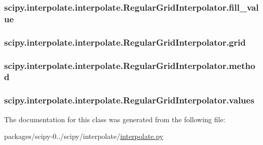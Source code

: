 \subsubsection[{fill\+\_\+value}]{\setlength{\rightskip}{0pt plus 5cm}scipy.\+interpolate.\+interpolate.\+Regular\+Grid\+Interpolator.\+fill\+\_\+value}\label{classscipy_1_1interpolate_1_1interpolate_1_1RegularGridInterpolator_a38ab6f966f9896146ecb5e2b28010e75}
\hypertarget{classscipy_1_1interpolate_1_1interpolate_1_1RegularGridInterpolator_a7944b1767b70979b680e56e692945b91}{}
\subsubsection[{grid}]{\setlength{\rightskip}{0pt plus 5cm}scipy.\+interpolate.\+interpolate.\+Regular\+Grid\+Interpolator.\+grid}\label{classscipy_1_1interpolate_1_1interpolate_1_1RegularGridInterpolator_a7944b1767b70979b680e56e692945b91}
\hypertarget{classscipy_1_1interpolate_1_1interpolate_1_1RegularGridInterpolator_a1c6dfe56b1299842a43ddc43ed6a2b0e}{}
\subsubsection[{method}]{\setlength{\rightskip}{0pt plus 5cm}scipy.\+interpolate.\+interpolate.\+Regular\+Grid\+Interpolator.\+method}\label{classscipy_1_1interpolate_1_1interpolate_1_1RegularGridInterpolator_a1c6dfe56b1299842a43ddc43ed6a2b0e}
\hypertarget{classscipy_1_1interpolate_1_1interpolate_1_1RegularGridInterpolator_ae8b5cb5ea1465c66b3d9d6f381775d50}{}
\subsubsection[{values}]{\setlength{\rightskip}{0pt plus 5cm}scipy.\+interpolate.\+interpolate.\+Regular\+Grid\+Interpolator.\+values}\label{classscipy_1_1interpolate_1_1interpolate_1_1RegularGridInterpolator_ae8b5cb5ea1465c66b3d9d6f381775d50}


The documentation for this class was generated from the following file\+:\begin{DoxyCompactItemize}
\item 
packages/scipy-\/0../scipy/interpolate/\hyperlink{interpolate_8py}{interpolate.\+py}\end{DoxyCompactItemize}
